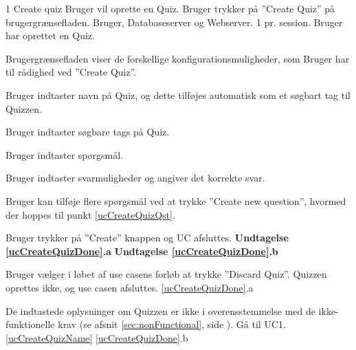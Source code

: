
\uchead
	{1}
	{Create quiz}
	{Bruger vil oprette en Quiz.}
	{Bruger trykker på ''Create Quiz'' på brugergrænsefladen.}
	{Bruger, Databaseserver og Webserver.}
	{}
	{1 pr. session.}
	{Bruger har oprettet en Quiz.}

\item Brugergrænsefladen viser de forskellige konfigurationsmuligheder, som Bruger har til rådighed ved ''Create Quiz''.

\item \label{ucCreateQuizName} Bruger indtaster navn på Quiz, og dette tilføjes automatisk som et søgbart tag til Quizzen.

\item Bruger indtaster søgbare tags på Quiz.

\item \label{ucCreateQuizQst} Bruger indtaster spørgsmål.

\item Bruger indtaster svarmuligheder og angiver det korrekte svar.

\item Bruger kan tilføje flere spørgsmål ved at trykke ''Create new question'', hvormed der hoppes til punkt \ref{ucCreateQuizQst}.

\item \label{ucCreateQuizDone} Bruger trykker på ''Create'' knappen og UC afsluttes.
\textbf{Undtagelse \ref{ucCreateQuizDone}.a} \textbf{Undtagelse \ref{ucCreateQuizDone}.b}

\ucdescriptionend

\ucextension
	{Bruger vælger i løbet af use casens forløb at trykke ''Discard Quiz''.}
	{Quizzen oprettes ikke, og use casen afsluttes.}
	{\ref{ucCreateQuizDone}.a}
	
\ucextension
	{De indtastede oplysninger om Quizzen er ikke i overensstemmelse med de ikke-funktionelle krav (se afsnit \ref{sec:nonFunctional}, side \pageref{sec:nonFunctional}).}
	{Gå til UC1.\ref{ucCreateQuizName}}
	{\ref{ucCreateQuizDone}.b}
		
